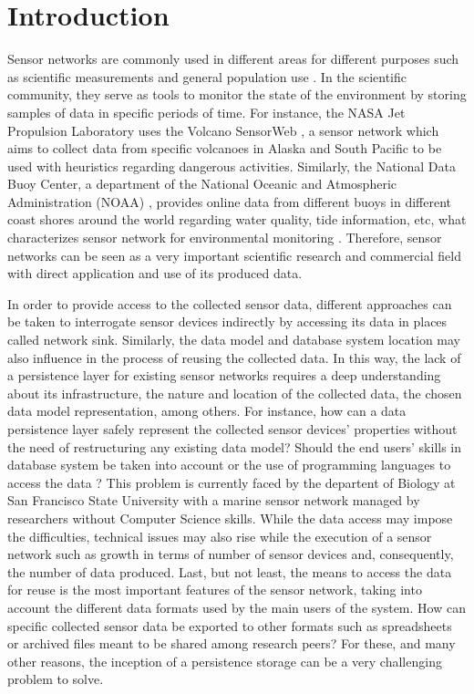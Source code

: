 


\chapter{Introduction}

Sensor networks are commonly used in different areas for different purposes
such as scientific measurements and general population use \cite{sn-intro01}
\cite{sn-intro02}. In the scientific community, they serve as tools to monitor
the state of the environment by storing samples of data in specific periods of
time. For instance, the NASA Jet Propulsion Laboratory uses the Volcano
SensorWeb \cite{sn-ex02}, a sensor network which aims to collect data from
specific volcanoes in Alaska and South Pacific to be used with heuristics
regarding dangerous activities. Similarly, the National Data Buoy Center, a
department of the National Oceanic and Atmospheric Administration (NOAA)
\cite{sn-ex03}, provides online data from different buoys in different coast
shores around the world regarding water quality, tide information, etc, what
characterizes sensor network for environmental monitoring \cite{sn-ex01}.
Therefore, sensor networks can be seen as a very important scientific research
and commercial field with direct application and use of its produced data.

In order to provide access to the collected sensor data, different approaches
can be taken to interrogate sensor devices indirectly by accessing its data in
places called network sink. Similarly, the data model and database system
location may also influence in the process of reusing the collected data. In
this way, the lack of a persistence layer for existing sensor networks requires
a deep understanding about its infrastructure, the nature and location of the
collected data, the chosen data model representation, among others. For
instance, how can a data persistence layer safely represent the collected sensor
devices' properties without the need of restructuring any existing data model?
Should the end users' skills in database system be taken into account or the
use of programming languages to access the data \cite{sn-programming-language}?
This problem is currently faced by the departent of Biology at San
Francisco State University with a marine sensor network managed by
researchers without Computer Science skills. While the data access may impose
the difficulties, technical issues may also rise while the execution of a
sensor network such as growth in terms of number of sensor devices and,
consequently, the number of data produced. Last, but not least, the means to
access the data for reuse is the most important features of the sensor
network, taking into account the different data formats used by the main users
of the system. How can specific collected sensor data be exported to other
formats such as spreadsheets or archived files meant to be shared among
research peers? For these, and many other reasons, the inception of a
persistence storage can be a very challenging problem to solve.


